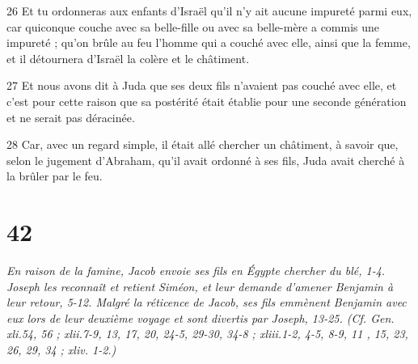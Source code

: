 \par 26 Et tu ordonneras aux enfants d'Israël qu'il n'y ait aucune impureté parmi eux, car quiconque couche avec sa belle-fille ou avec sa belle-mère a commis une impureté ; qu'on brûle au feu l'homme qui a couché avec elle, ainsi que la femme, et il détournera d'Israël la colère et le châtiment.
\par 27 Et nous avons dit à Juda que ses deux fils n'avaient pas couché avec elle, et c'est pour cette raison que sa postérité était établie pour une seconde génération et ne serait pas déracinée.
\par 28 Car, avec un regard simple, il était allé chercher un châtiment, à savoir que, selon le jugement d'Abraham, qu'il avait ordonné à ses fils, Juda avait cherché à la brûler par le feu.

\chapter{42}

\par \textit{En raison de la famine, Jacob envoie ses fils en Égypte chercher du blé, 1-4. Joseph les reconnaît et retient Siméon, et leur demande d'amener Benjamin à leur retour, 5-12. Malgré la réticence de Jacob, ses fils emmènent Benjamin avec eux lors de leur deuxième voyage et sont divertis par Joseph, 13-25. (Cf. Gen. xli.54, 56 ; xlii.7-9, 13, 17, 20, 24-5, 29-30, 34-8 ; xliii.1-2, 4-5, 8-9, 11 , 15, 23, 26, 29, 34 ; xliv. 1-2.)}

